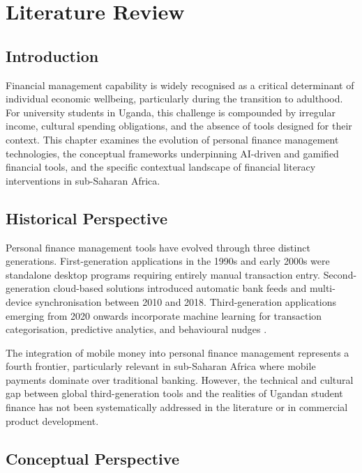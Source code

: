 \documentclass[12pt]{report}
\begin{document}

\chapter{Literature Review}
\label{ch:chapter-02}
\section{Introduction}

Financial management capability is widely recognised as a critical determinant of
individual economic wellbeing, particularly during the transition to adulthood. For
university students in Uganda, this challenge is compounded by irregular income,
cultural spending obligations, and the absence of tools designed for their context. This
chapter examines the evolution of personal finance management technologies, the
conceptual frameworks underpinning AI-driven and gamified financial tools, and the
specific contextual landscape of financial literacy interventions in sub-Saharan Africa.

\section{Historical Perspective}

Personal finance management tools have evolved through three distinct generations.
First-generation applications in the 1990s and early 2000s were standalone desktop
programs requiring entirely manual transaction entry. Second-generation cloud-based
solutions introduced automatic bank feeds and multi-device synchronisation between
2010 and 2018. Third-generation applications emerging from 2020 onwards incorporate
machine learning for transaction categorisation, predictive analytics, and behavioural
nudges \citep{Imawan2025}.

The integration of mobile money into personal finance management represents a fourth
frontier, particularly relevant in sub-Saharan Africa where mobile payments dominate
over traditional banking. However, the technical and cultural gap between global
third-generation tools and the realities of Ugandan student finance has not been
systematically addressed in the literature or in commercial product development.

\section{Conceptual Perspective}
\end{document}
